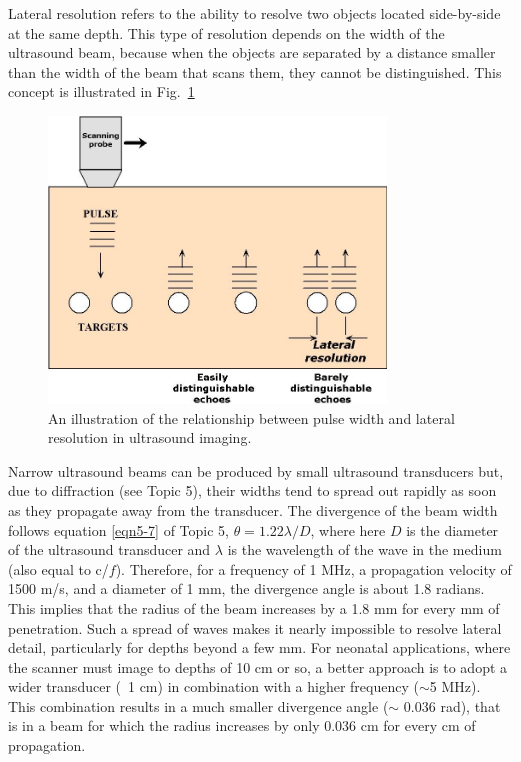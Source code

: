 Lateral resolution refers to the ability to resolve two objects located side-by-side at the same depth. This type of resolution depends on the width of the ultrasound beam, because when the objects are separated by a distance smaller than the width of the beam that scans them, they cannot be distinguished. This concept is illustrated in Fig.~\ref{Fig10-6}
\begin{figure}[!htb]
	\centering
	\includegraphics[height=3.0in]{./figures/Topic10/Fig10-6.jpg}
	\caption{An illustration of the relationship between pulse width and lateral resolution in ultrasound imaging.}
	\label{Fig10-6}
\end{figure}
Narrow ultrasound beams can be produced by small ultrasound transducers but, due to diffraction (see Topic 5), their widths tend to spread out rapidly as soon as they propagate away from the transducer. The divergence of the beam width follows equation \ref{eqn5-7} of Topic 5, $\theta = 1.22\lambda/D$, where here $D$ is the diameter of the ultrasound transducer and $\lambda$ is the wavelength of the wave in the medium (also equal to c/$f$). Therefore, for a frequency of 1 MHz, a propagation velocity of 1500 m/s, and a diameter of 1 mm, the divergence angle is about 1.8 radians. This implies that the radius of the beam increases by a 1.8 mm for every mm of penetration. Such a spread of waves makes it nearly impossible to resolve lateral detail, particularly for depths beyond a few mm. For neonatal applications, where the scanner must image to depths of 10 cm or so, a better approach is to adopt a wider transducer (~1 cm) in combination with a higher frequency ($\sim$5 MHz). This combination results in a much smaller divergence angle ($\sim$ 0.036 rad), that is in a beam for which the radius increases by only 0.036 cm for every cm of propagation.   
 
